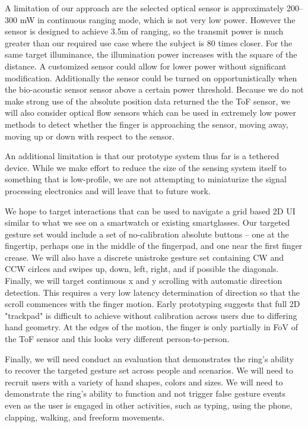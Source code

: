 \documentclass [11pt, proquest] {uwthesis}[2020/02/24]
\begin{document}
A limitation of our approach are the selected optical sensor is approximately 200--300 mW in continuous ranging mode, which is not very low power. However the sensor is designed to achieve  3.5m of ranging, so the transmit power is much greater than our required use case where the subject is 80 times closer. For the same target illuminance, the illumination power increases with the square of the distance. A customized sensor could allow for lower power without significant modification. Additionally the sensor could be turned on opportunistically when the bio-acoustic sensor sensor above a certain power threshold. Because we do not make strong use of the absolute position data returned the the ToF sensor, we will also consider optical flow sensors which can be used in extremely low power methods to detect whether the finger is approaching the sensor, moving away, moving up or down with respect to the sensor.

An additional limitation is that our prototype system thus far is a tethered  device. While we make effort to reduce the size of the sensing system itself to something that is low-profile, we are not attempting to miniaturize the signal processing electronics and will leave that to future work. 

We hope to target interactions that can be used to navigate a grid based 2D UI similar to what we see on a smartwatch or existing smartglasses. Our targeted gesture set would include  a set of no-calibration absolute buttons -- one at the fingertip, perhaps one in the middle of the fingerpad, and one near the first finger crease. We will also have a discrete unistroke gesture set containing CW and CCW cirlces and swipes up, down, left, right, and if possible the diagonals. Finally, we will target continuous x and y scrolling with automatic direction detection. This requires a very low latency determination of direction so that the scroll commences with the finger motion. Early prototyping suggests that full 2D "trackpad" is difficult to achieve without calibration across users due to differing hand geometry. At the edges of the motion, the finger is only partially in FoV of the ToF sensor and this looks very different person-to-person.

Finally, we will need conduct an evaluation that demonstrates the ring's ability to recover the targeted gesture set across people and scenarios. We will need to recruit users with a variety of hand shapes, colors and sizes. We will need to demonstrate the ring's ability to function and not trigger false gesture events even as the user is engaged in other activities, such as typing, using the phone, clapping, walking, and freeform movements.
\end{document}
